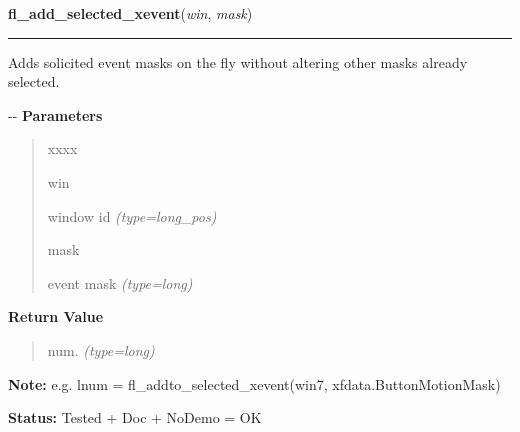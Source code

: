 \hspace{.8\funcindent}\begin{boxedminipage}{\funcwidth}

    \raggedright \textbf{fl\_add\_selected\_xevent}(\textit{win}, \textit{mask})

    \vspace{-1.5ex}

    \rule{\textwidth}{0.5\fboxrule}
\setlength{\parskip}{2ex}

Adds solicited event masks on the fly without altering other masks
already selected.

-{}-
\setlength{\parskip}{1ex}
      \textbf{Parameters}
      \vspace{-1ex}

      \begin{quote}
        \begin{Ventry}{xxxx}

          \item[win]


window id
            {\it (type=long\_pos)}

          \item[mask]


event mask
            {\it (type=long)}

        \end{Ventry}

      \end{quote}

      \textbf{Return Value}
    \vspace{-1ex}

      \begin{quote}

num.
      {\it (type=long)}

      \end{quote}

\textbf{Note:} 
e.g. lnum = fl\_addto\_selected\_xevent(win7,         xfdata.ButtonMotionMask)


\textbf{Status:} 
Tested + Doc + NoDemo = OK


    \end{boxedminipage}

    \label{xformslib:flxbasic:fl_set_idle_delta}

    \vspace{0.5ex}

